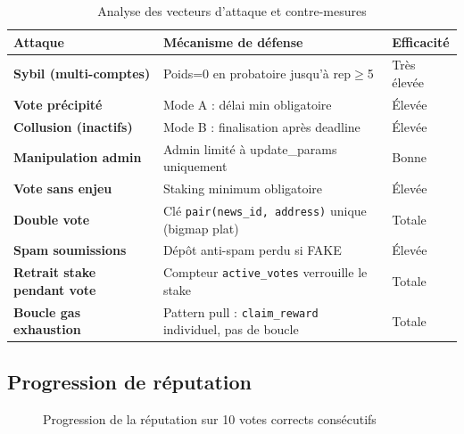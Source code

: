 \documentclass[12pt,a4paper]{article}
\begin{document}
\begin{table}[H]
\centering
\renewcommand{\arraystretch}{1.5}
\begin{tabular}{L{3.5cm} L{4.5cm} C{2.5cm}}
\toprule
{}
\textbf{Attaque} & \textbf{Mécanisme de défense} & \textbf{Efficacité} \\
\midrule
\textbf{Sybil (multi-comptes)} & Poids=0 en probatoire jusqu'à rep$\geq$5 & Très élevée \\
\textbf{Vote précipité}        & Mode A : délai min obligatoire            & Élevée \\
\textbf{Collusion (inactifs)}  & Mode B : finalisation après deadline      & Élevée \\
\textbf{Manipulation admin}    & Admin limité à update\_params uniquement  & Bonne \\
\textbf{Vote sans enjeu}       & Staking minimum obligatoire               & Élevée \\
\textbf{Double vote}           & Clé \texttt{pair(news\_id, address)} unique (bigmap plat) & Totale \\
\textbf{Spam soumissions}      & Dépôt anti-spam perdu si FAKE             & Élevée \\
\textbf{Retrait stake pendant vote} & Compteur \texttt{active\_votes} verrouille le stake & Totale \\
\textbf{Boucle gas exhaustion} & Pattern pull : \texttt{claim\_reward} individuel, pas de boucle & Totale \\
\bottomrule
\end{tabular}
\caption{Analyse des vecteurs d'attaque et contre-mesures}
\end{table}

\subsection{Progression de réputation}

\begin{figure}[H]
\centering
{}
\caption{Progression de la réputation sur 10 votes corrects consécutifs}
\label{fig:repchart}
\end{figure}
\end{document}
